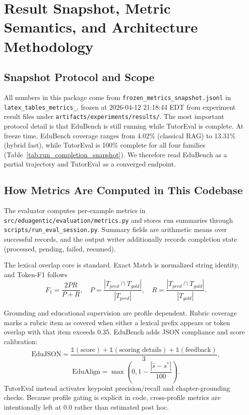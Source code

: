 
\section{Result Snapshot, Metric Semantics, and Architecture Methodology}

\subsection{Snapshot Protocol and Scope}
All numbers in this package come from \texttt{frozen\_metrics\_snapshot.jsonl} in \texttt{latex\_tables\_metrics\_}, frozen at 2026-04-12 21:18:44 EDT from experiment result files under \texttt{artifacts/experiments/results/}. The most important protocol detail is that EduBench is still running while TutorEval is complete. At freeze time, EduBench coverage ranges from 4.02\% (classical RAG) to 13.31\% (hybrid fast), while TutorEval is 100\% complete for all four families (Table~\ref{tab:run_completion_snapshot}). We therefore read EduBench as a partial trajectory and TutorEval as a converged endpoint.

\subsection{How Metrics Are Computed in This Codebase}
The evaluator computes per-example metrics in \texttt{src/eduagentic/evaluation/metrics.py} and stores run summaries through \texttt{scripts/run\_eval\_session.py}. Summary fields are arithmetic means over successful records, and the output writer additionally records completion state (processed, pending, failed, resumed).

The lexical overlap core is standard. Exact Match is normalized string identity, and Token-F1 follows
\begin{equation}
F_1 = \frac{2PR}{P+R},\quad
P = \frac{|T_{pred} \cap T_{gold}|}{|T_{pred}|},\quad
R = \frac{|T_{pred} \cap T_{gold}|}{|T_{gold}|}.
\end{equation}

Grounding and educational supervision are profile dependent. Rubric coverage marks a rubric item as covered when either a lexical prefix appears or token overlap with that item exceeds 0.35. EduBench adds JSON compliance and score calibration:
\begin{equation}
\text{EduJSON} = \frac{\mathbb{1}(\text{score}) + \mathbb{1}(\text{scoring details}) + \mathbb{1}(\text{feedback})}{3},
\end{equation}
\begin{equation}
\text{EduAlign} = \max\left(0, 1 - \frac{|\hat{s} - s^*|}{100}\right).
\end{equation}
TutorEval instead activates keypoint precision/recall and chapter-grounding checks. Because profile gating is explicit in code, cross-profile metrics are intentionally left at 0.0 rather than estimated post hoc.


